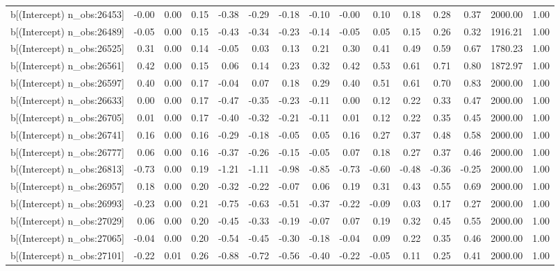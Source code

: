 \begin{table}[ht]
\begin{tabular}{rrrrrrrrrrrrrrr}
  b[(Intercept) n\_obs:26453] & -0.00 & 0.00 & 0.15 & -0.38 & -0.29 & -0.18 & -0.10 & -0.00 & 0.10 & 0.18 & 0.28 & 0.37 & 2000.00 & 1.00 \\ 
  b[(Intercept) n\_obs:26489] & -0.05 & 0.00 & 0.15 & -0.43 & -0.34 & -0.23 & -0.14 & -0.05 & 0.05 & 0.15 & 0.26 & 0.32 & 1916.21 & 1.00 \\ 
  b[(Intercept) n\_obs:26525] & 0.31 & 0.00 & 0.14 & -0.05 & 0.03 & 0.13 & 0.21 & 0.30 & 0.41 & 0.49 & 0.59 & 0.67 & 1780.23 & 1.00 \\ 
  b[(Intercept) n\_obs:26561] & 0.42 & 0.00 & 0.15 & 0.06 & 0.14 & 0.23 & 0.32 & 0.42 & 0.53 & 0.61 & 0.71 & 0.80 & 1872.97 & 1.00 \\ 
  b[(Intercept) n\_obs:26597] & 0.40 & 0.00 & 0.17 & -0.04 & 0.07 & 0.18 & 0.29 & 0.40 & 0.51 & 0.61 & 0.70 & 0.83 & 2000.00 & 1.00 \\ 
  b[(Intercept) n\_obs:26633] & 0.00 & 0.00 & 0.17 & -0.47 & -0.35 & -0.23 & -0.11 & 0.00 & 0.12 & 0.22 & 0.33 & 0.47 & 2000.00 & 1.00 \\ 
  b[(Intercept) n\_obs:26705] & 0.01 & 0.00 & 0.17 & -0.40 & -0.32 & -0.21 & -0.11 & 0.01 & 0.12 & 0.22 & 0.35 & 0.45 & 2000.00 & 1.00 \\ 
  b[(Intercept) n\_obs:26741] & 0.16 & 0.00 & 0.16 & -0.29 & -0.18 & -0.05 & 0.05 & 0.16 & 0.27 & 0.37 & 0.48 & 0.58 & 2000.00 & 1.00 \\ 
  b[(Intercept) n\_obs:26777] & 0.06 & 0.00 & 0.16 & -0.37 & -0.26 & -0.15 & -0.05 & 0.07 & 0.18 & 0.27 & 0.37 & 0.46 & 2000.00 & 1.00 \\ 
  b[(Intercept) n\_obs:26813] & -0.73 & 0.00 & 0.19 & -1.21 & -1.11 & -0.98 & -0.85 & -0.73 & -0.60 & -0.48 & -0.36 & -0.25 & 2000.00 & 1.00 \\ 
  b[(Intercept) n\_obs:26957] & 0.18 & 0.00 & 0.20 & -0.32 & -0.22 & -0.07 & 0.06 & 0.19 & 0.31 & 0.43 & 0.55 & 0.69 & 2000.00 & 1.00 \\ 
  b[(Intercept) n\_obs:26993] & -0.23 & 0.00 & 0.21 & -0.75 & -0.63 & -0.51 & -0.37 & -0.22 & -0.09 & 0.03 & 0.17 & 0.27 & 2000.00 & 1.00 \\ 
  b[(Intercept) n\_obs:27029] & 0.06 & 0.00 & 0.20 & -0.45 & -0.33 & -0.19 & -0.07 & 0.07 & 0.19 & 0.32 & 0.45 & 0.55 & 2000.00 & 1.00 \\ 
  b[(Intercept) n\_obs:27065] & -0.04 & 0.00 & 0.20 & -0.54 & -0.45 & -0.30 & -0.18 & -0.04 & 0.09 & 0.22 & 0.35 & 0.46 & 2000.00 & 1.00 \\ 
  b[(Intercept) n\_obs:27101] & -0.22 & 0.01 & 0.26 & -0.88 & -0.72 & -0.56 & -0.40 & -0.22 & -0.05 & 0.11 & 0.25 & 0.41 & 2000.00 & 1.00 \\ 

\end{tabular}
\end{table}
